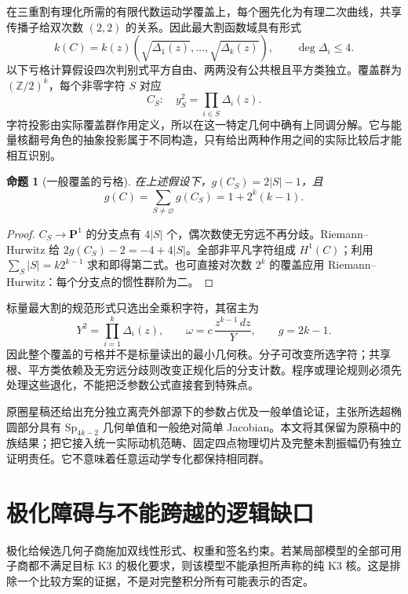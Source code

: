\documentclass[11pt,a4paper,oneside]{ctexrep}
\theoremstyle{cnplain}
\newtheorem{proposition}[theorem]{命题}
\theoremstyle{definition}
\theoremstyle{remark}
\newcommand{\Z}{\mathbb Z}
\begin{document}
在三重割有理化所需的有限代数运动学覆盖上，每个圈先化为有理二次曲线，共享传播子给双次数 $(2,2)$ 的关系。因此最大割函数域具有形式
\begin{equation}
 k(C)=k(z)(\sqrt{\Delta_1(z)},\ldots,\sqrt{\Delta_k(z)}),
 \qquad\deg\Delta_i\le4.
\end{equation}
以下亏格计算假设四次判别式平方自由、两两没有公共根且平方类独立。覆盖群为 $(\Z/2)^k$，每个非零字符 $S$ 对应
\begin{equation}
 C_S:\quad y_S^2=\prod_{i\in S}\Delta_i(z).
\end{equation}
字符投影由实际覆盖群作用定义，所以在这一特定几何中确有上同调分解。它与能量核翻号角色的抽象投影属于不同构造，只有给出两种作用之间的实际比较后才能相互识别。

\begin{proposition}[一般覆盖的亏格]
在上述假设下，$g(C_S)=2|S|-1$，且
\begin{equation}
 g(C)=\sum_{S\ne\varnothing}g(C_S)=1+2^k(k-1).
\end{equation}
\end{proposition}
\begin{proof}
$C_S\to\mathbf P^1$ 的分支点有 $4|S|$ 个，偶次数使无穷远不再分歧。Riemann--Hurwitz 给 $2g(C_S)-2=-4+4|S|$。全部非平凡字符组成 $H^1(C)$；利用 $\sum_S|S|=k2^{k-1}$ 求和即得第二式。也可直接对次数 $2^k$ 的覆盖应用 Riemann--Hurwitz：每个分支点的惯性群阶为二。
\end{proof}

标量最大割的规范形式只选出全乘积字符，其宿主为
\begin{equation}
 Y^2=\prod_{i=1}^k\Delta_i(z),\qquad
 \omega=c\,\frac{z^{k-1}\,dz}{Y},\qquad g=2k-1.
\end{equation}
因此整个覆盖的亏格并不是标量读出的最小几何秩。分子可改变所选字符；共享根、平方类依赖及无穷远分歧则改变正规化后的分支计数。程序或理论规则必须先处理这些退化，不能把泛参数公式直接套到特殊点。

原圈星稿还给出充分独立离壳外部源下的参数占优及一般单值论证，主张所选超椭圆部分具有 $\mathrm{Sp}_{4k-2}$ 几何单值和一般绝对简单 Jacobian。本文将其保留为原稿中的族结果；把它接入统一实际动机范畴、固定四点物理切片及完整未割振幅仍有独立证明责任。它不意味着任意运动学专化都保持相同群。

\section{极化障碍与不能跨越的逻辑缺口}
极化给候选几何子商施加双线性形式、权重和签名约束。若某局部模型的全部可用子商都不满足目标 K3 的极化要求，则该模型不能承担所声称的纯 K3 核。这是排除一个比较方案的证据，不是对完整积分所有可能表示的否定。
\end{document}
